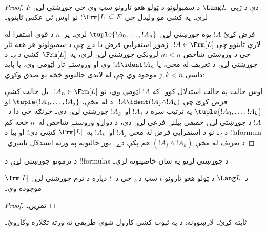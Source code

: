 \documentclass[../../../include/open-logic-section]{subfiles}
\begin{document}
\begin{proof}
$F$ دې د ژبې~$\Lang L$ د سمبولونو د ټولو هغو تارونو سټ وي چې جوړښتي
لړۍ لري۔ په
 کښې مو وليدل چې $\Frm[L] \subseteq
F$؛ نو اوس ئې عکس ثابتوو۔

فرض کړئ $!A$ يوه جوړښتي لړۍ $\tuple{!A_0,\dotsc,!A_n}$ لري۔ پر~$n$
د قوي استقرا له لارې ثابتوو چې $!A \in \Frm[L]$۔ زموږ استقرايي فرض
دا دے چې د سمبولونو هر هغه تار چې د وروستي شاخص $m < n$ لرونکې
جوړښتي لړۍ لري، په~$\Frm[L]$ کښې دے۔ د جوړښتي لړۍ د تعريف له مخې، يا
$!A \ident !A_n$ وي او وروستے تار اټومي وي، يا بايد داسې $j,k < n$
موجود وي چې له لاندې حالتونو څخه يو صدق وکړي:
\begin{enumerate}
\end{enumerate}
اوس حالت په حالت استدلال کوو۔ که $!A$ اټومي وي، نو
$!A_n \in \Frm[L]$۔ بل حالت کښې فرض کړئ چې
$!A \ident (!A_j \land !A_k)$۔ د
 له مخې،
$\tuple{!A_0,\dotsc,!A_j}$ او $\tuple{!A_0,\dotsc,!A_k}$ په ترتيب
سره د $!A_j$ او~$!A_k$ جوړښتي لړۍ دي۔ څرنګه چې دا د~$!A$ د جوړښتي
لړۍ حقيقي پيلنۍ فرعي لړۍ دي، د دواړو وروستے شاخص له~$n$ څخه کم دے۔
نو د استقرايي فرض له مخې $!A_j$ او~$!A_k$ په~$\Frm[L]$ کښې دي؛ او
بيا د !!a{formula} د تعريف له مخې $(!A_j \land !A_k)$ هم پکې دے۔ نور
حالتونه په ورته استدلال ثابتېږي۔
\end{proof}

د ترمونو جوړښتي لړۍ د !!{formula}s د جوړښتي لړيو په شان خاصيتونه لري۔

\begin{prop}
$\Trm[L]$ د~$\Lang L$ د ټولو هغو تارونو $t$ سټ دے چې د~$t$ دپاره
د ترم جوړښتي لړۍ موجوده وي۔
\end{prop}

\begin{proof}
تمرين۔
\end{proof}

\begin{prob}
 ثابته کړئ۔
لارښوونه: د
 په ثبوت کښې کارول شوې
طريقې ته ورته تګلاره وکاروئ۔
\end{prob}
\end{document}
